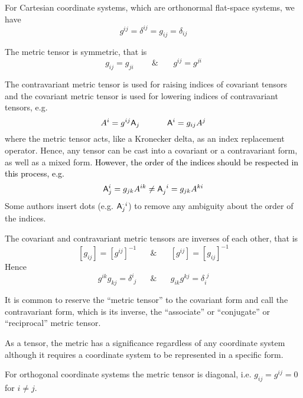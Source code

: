  For Cartesian coordinate systems, which are orthonormal
flat-space systems, we have
\begin{equation}
g^{ij}=\delta^{ij}=g_{ij}=\delta_{ij}
\end{equation}


 The metric tensor is symmetric, that is
\begin{equation}
g_{ij}=g_{ji}\,\,\,\,\,\,\,\,\,\,\,\,\,\&\,\,\,\,\,\,\,\,\,\,\,g^{ij}=g^{ji}
\end{equation}


 The contravariant metric tensor is used for raising indices
of covariant tensors and the covariant metric tensor is used for lowering
indices of contravariant tensors, e.g.
\begin{equation}
A^{i}=g^{ij}\mathsf{A}_j\,\,\,\,\,\,\,\,\,\,\,\,\,\,\,\,\,\,\,\,\mathsf{A}^i=g_{ij}A^{j}
\end{equation}
where the metric tensor acts, like a Kronecker delta, as an index
replacement operator. Hence, any tensor can be cast into a covariant
or a contravariant form, as well as a mixed form. \textcolor{black}{However,
the order of the indices should be respected in this process, e.g.}
\begin{equation}
\mathsf{A}_j^{i}=g_{jk}A^{ik}\ne \mathsf{A}_j^{\,\,\,i}=g_{jk}A^{ki}
\end{equation}
Some authors insert dots (e.g. $\mathsf{A}_j^{\cdot\,i}$) to remove any
ambiguity about the order of the indices.

 The covariant and contravariant metric tensors are inverses
of each other, that is
\begin{equation}
\left[g_{ij}\right]=\left[g^{ij}\right]^{-1}\,\,\,\,\,\,\,\,\,\,\&\,\,\,\,\,\,\,
\,\,\,\left[g^{ij}\right]=\left[g_{ij}\right]^{-1}
\end{equation}
Hence
\begin{equation}
g^{ik}g_{kj}=\delta_{\,\,j}^{i}\,\,\,\,\,\,\,\,\,\,\&\,\,\,\,\,\,\,\,\,\,g_{ik}
g^{kj}=\delta_{i}^{\,\,j}
\end{equation}


 It is common to reserve the ``metric tensor'' to the
covariant form and call the contravariant form, which is its inverse,
the ``associate'' or ``conjugate'' or ``reciprocal'' metric
tensor.

 As a tensor, the metric has a significance regardless of
any coordinate system although it requires a coordinate system to
be represented in a specific form.

 For orthogonal coordinate systems the metric tensor is
diagonal, i.e. $g_{ij}=g^{ij}=0$ for $i\ne j$.

